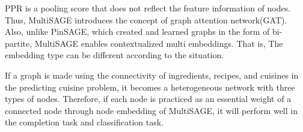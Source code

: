 PPR is a pooling score that does not reflect the feature information of nodes.
Thus, MultiSAGE\cite{yang2020multisage} introduces the concept of graph attention network(GAT)\cite{velivckovic2017graph}.
Also, unlike PinSAGE, which created and learned graphs in the form of bi-partite, MultiSAGE enables contextualized multi embeddings.
That is, The embedding type can be different according to the situation.

If a graph is made using the connectivity of ingredients, recipes, and cuisines in the predicting cuisine problem, it becomes a heterogeneous network with three types of nodes.
Therefore, if each node is practiced as an essential weight of a connected node through node embedding of MultiSAGE, it will perform well in the completion task and classification task.
